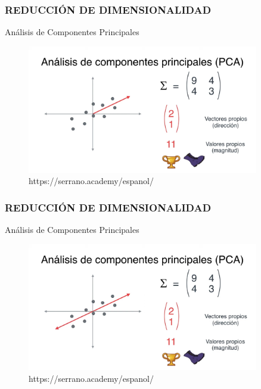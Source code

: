\documentclass{beamer}
\begin{document}
\begin{frame}
	\frametitle{REDUCCIÓN DE DIMENSIONALIDAD}
	\begin{block}{Análisis de Componentes Principales}	
		\begin{figure}
			\includegraphics[width=0.9\textwidth]{PCA/IMG_3585.jpg}
			\caption{https://serrano.academy/espanol/}
		\end{figure}
	\end{block}
\end{frame}


\begin{frame}
	\frametitle{REDUCCIÓN DE DIMENSIONALIDAD}
	\begin{block}{Análisis de Componentes Principales}	
		\begin{figure}
			\includegraphics[width=0.9\textwidth]{PCA/IMG_3586.jpg}
			\caption{https://serrano.academy/espanol/}
		\end{figure}
	\end{block}
\end{frame}
\end{document}

